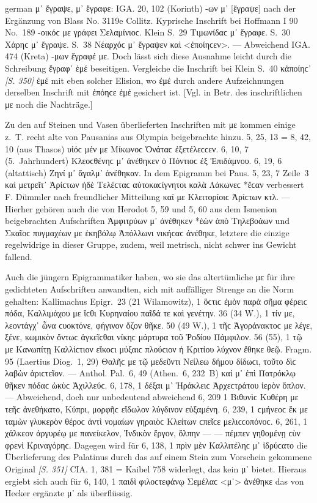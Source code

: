 \begin{otherlanguage*}{german}
μ᾽ ἔγραψε, μ᾽ ἔγραφε: IGA. 20, 102 (Korinth) -ων μ᾽ [ἔγραψε] nach der Ergänzung von Blass No. 3119e Collitz. Kyprische Inschrift bei Hoffmann I 90 No.~189 -οικόϲ με γράφει Σελαμίνιοϲ. Klein S.~29 Τιμωνίδαϲ μ᾽ ἔγραφε. S.~30 Χάρηϲ μ᾽ ἔγραψε. S.~38 Νέαρχόϲ μ᾽ ἔγραψεν καὶ <ἐποίηϲεν>. — Abweichend IGA. 474 (Kreta) -μων ἔγραφέ με. Doch lässt sich diese Ausnahme leicht durch die Schreibung ἔγραφ᾽ ἐμέ beseitigen. Vergleiche die Inschrift bei Klein S.~40 κἀποίηϲ᾽ \hypertarget{p350}{\emph{[S. 350]}}\label{p350} ἐμέ mit eben solcher Elision, wo ἐμέ durch andere Aufzeichnungen derselben Inschrift mit ἐπόηϲε ἐμέ gesichert ist. [Vgl. in Betr. des inschriftlichen με noch die Nachträge.]

Zu den auf Steinen und Vasen überlieferten Inschriften mit με kommen einige z.~T. recht alte von Pausanias aus Olympia beigebrachte hinzu. 5, 25, 13 = 8, 42, 10 (aus Thasos) υἱόϲ μέν με Μίκωνοϲ Ὀνάταϲ ἐξετέλεϲϲεν. 6, 10, 7 (5.~Jahrhundert) Κλεοϲθένηϲ μ᾽ ἀνέθηκεν ὁ Πόντιοϲ ἐξ Ἐπιδάμνου. 6, 19, 6 (altattisch) Ζηνί μ᾽ ἄγαλμ᾽ ἀνέθηκαν. In dem Epigramm bei Paus. 5, 23, 7 Zeile~3 καὶ μετρεῖτ᾽ Ἀρίϲτων ἠδὲ Τελέϲταϲ αὐτοκαϲίγνητοι καλὰ Λάκωνεϲ *ἔϲαν verbessert F. Dümmler nach freundlicher Mitteilung καί με Κλειτορίοιϲ Ἀρίϲτων κτλ. — Hierher gehören auch die von Herodot 5, 59 und 5, 60 aus dem Ismenion beigebrachten Aufschriften Ἀμφιτρύων μ᾽ ἀνέθηκεν *ἐὼν ἀπὸ Τηλεβοάων und Σκαῖοϲ πυγμαχέων με ἑκηβόλῳ Ἀπόλλωνι νικήϲαϲ ἀνέθηκε, letztere die einzige regelwidrige in dieser Gruppe, zudem, weil metrisch, nicht schwer ins Gewicht fallend.

Auch die jüngern Epigrammatiker haben, wo sie das altertümliche με für ihre gedichteten Aufschriften anwandten, sich mit auffälliger Strenge an die Norm gehalten: Kallimachus Epigr.~23 (21 Wilamowitz), 1 ὅϲτιϲ ἐμὸν παρὰ σῆμα φέρειϲ πόδα, Καλλιμάχου με ἴϲθι Κυρηναίου παῖδά τε καὶ γενέτην. 36 (34 W.), 1 τίν με, λεοντάγχ᾽ ὦνα ϲυοκτόνε, φήγινον ὄζον θῆκε. 50 (49 W.), 1 τῆϲ Ἀγοράνακτοϲ με λέγε, ξένε, κωμικὸν ὄντωϲ ἀγκεῖϲθαι νίκηϲ μάρτυρα τοῦ Ῥοδίου Πάμφιλον. 56 (55), 1 τῷ με Κανωπίτῃ Καλλίϲτιον εἴκοϲι μύξαιϲ πλούϲιον ἡ Κριτίου λύχνον ἔθηκε θεῷ. Fragm. 95 (Laertius Diog.~1, 29) Θαλῆϲ με τῷ μεδεῦντι Νείλεω δήμου δίδωϲι, τοῦτο δὶϲ λαβὼν ἀριϲτεῖον. — Anthol. Pal.~6, 49 (Athen.~6, 232~Β) καί μ᾽ ἐπὶ Πατρόκλῳ θῆκεν πόδαϲ ὠκὺϲ Ἀχιλλεύϲ. 6, 178, 1 δέξαι μ᾽ Ἡράκλειϲ Ἀρχεϲτράτου ἱερὸν ὅπλον. — Abweichend, doch nur unbedeutend abweichend 6, 209 1 Βιθυνὶϲ Κυθέρη με τεῆϲ ἀνεθήκατο, Κύπρι, μορφῆϲ εἴδωλον λύγδινον εὐξαμένη. 6, 239, 1 ϲμήνεοϲ ἔκ με ταμὼν γλυκερὸν θέροϲ ἀντὶ νομαίων γηραιὸϲ Κλείτων ϲπεῖϲε μελιϲϲοπόνοϲ. 6, 261, 1 χάλκεον ἀργυρέῳ με πανείκελον, Ἰνδικὸν ἔργον, ὄλπην — — πέμπεν γηθομένῃ ϲὺν φρενὶ Κριναγόρηϲ. Dagegen wird für 6, 138, 1 πρὶν μὲν Καλλιτέληϲ μ᾽ ἱδρύϲατο die Überlieferung des Palatinus durch das auf einem Stein zum Vorschein gekommene Original \hypertarget{p351}{\emph{[S. 351]}}\label{p351} CIA. 1, 381 = Kaibel 758 widerlegt, das kein μ᾽ bietet. Hieraus ergiebt sich auch für 6, 140, 1 παιδὶ φιλοϲτεφάνῳ Σεμέλαϲ <μ᾽> ἀνέθηκε das von Hecker ergänzte μ᾽ als überflüssig.


\end{otherlanguage*}
